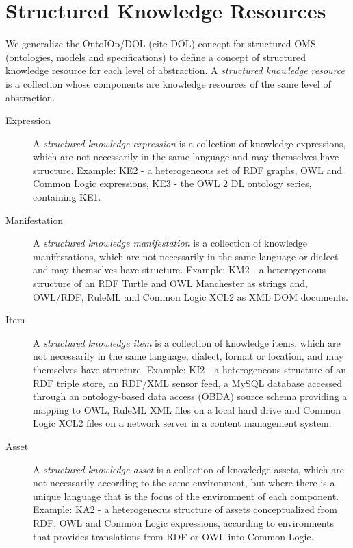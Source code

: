 \documentclass[runningheads]{llncs}
\begin{document}
\section{Structured Knowledge Resources}
\label{sec:structure}
We generalize the OntoIOp/DOL (cite DOL) concept for structured OMS (ontologies, models and specifications) to define a concept of structured knowledge resource for each level of abstraction. A \emph{structured knowledge resource} is a collection whose components are knowledge resources of the same level of abstraction.
\begin{description}
\item[Expression] A \emph{structured knowledge expression} is a collection of knowledge expressions, which are not necessarily in the same language and may themselves have structure. Example: KE2 - a heterogeneous set of RDF graphs, OWL and Common Logic expressions, KE3 - the OWL 2 DL ontology series, containing KE1.
\item[Manifestation] A \emph{structured knowledge manifestation} is a collection of knowledge manifestations, which are not necessarily in the same language or dialect and may themselves have structure. Example: KM2 -  a heterogeneous structure of an RDF Turtle and OWL Manchester as strings and, OWL/RDF, RuleML and Common Logic XCL2 as XML DOM documents.
\item[Item] A \emph{structured knowledge item} is a collection of knowledge items, which are not necessarily in the same language, dialect, format or location, and may themselves have structure. Example: KI2 -  a heterogeneous structure of an RDF triple store, an RDF/XML sensor feed, a MySQL database accessed through an ontology-based data access (OBDA) source schema providing a mapping to OWL, RuleML XML files on a local hard drive and Common Logic XCL2 files on a network server in a content management system.
\item[Asset] A \emph{structured knowledge asset} is a collection of knowledge assets, which are not necessarily according to the same environment, but where there is a unique language that is the focus of the environment of each component. Example: KA2 - a heterogeneous structure of assets conceptualized from RDF, OWL and Common Logic expressions, according to environments that provides translations from RDF or OWL into Common Logic.
\end{description}
\end{document}
